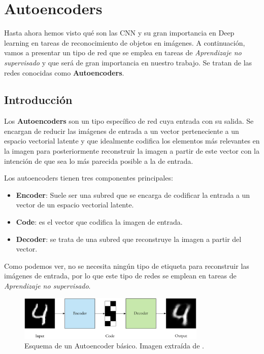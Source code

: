 \section{Autoencoders}
    \noindent Hasta ahora hemos visto qué son las CNN y su gran importancia en Deep learning en tareas de reconocimiento de objetos en imágenes. A continuación, vamos a presentar un tipo de red que se emplea en tareas de \textit{Aprendizaje no supervisado} y que será de gran importancia en nuestro trabajo. Se tratan de las redes conocidas como \textbf{Autoencoders}.

    \subsection{Introducción}
        \noindent Los \textbf{Autoencoders} \cite{autoencoders2017} son un tipo específico de red cuya entrada  con su salida. Se encargan de reducir las imágenes de entrada a un vector perteneciente a un espacio vectorial latente y que idealmente codifica los elementos más relevantes en la imagen para posteriormente reconstruir la imagen a partir de este vector con la intención de que sea lo más parecida posible a la de entrada.

        \medskip

        \noindent Los autoencoders tienen tres componentes principales: 

        \begin{itemize}
            \item \textbf{Encoder}: Suele ser una subred que se encarga de codificar la entrada a un vector de un espacio vectorial latente. 
            \item \textbf{Code}: es el vector que codifica la imagen de entrada. 
            \item \textbf{Decoder}: se trata de una subred que reconstruye la imagen a partir del vector.
        \end{itemize}

        \noindent Como podemos ver, no se necesita ningún tipo de etiqueta para reconstruir las imágenes de entrada, por lo que este tipo de redes se emplean en tareas de \textit{Aprendizaje no supervisado}.

        \begin{figure}[!h]
            \centering
            \includegraphics[width=0.8\textwidth]{img/Autoencoder.png}
            \caption{Esquema de un Autoencoder básico. Imagen extraída de \cite{autoencoders2017}.}
            \label{fig:Autoencoder}
        \end{figure}

